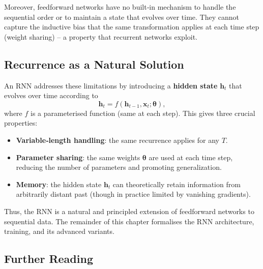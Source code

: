 \documentclass{tufte-handout}
\begin{document}
Moreover, feedforward networks have no built‑in mechanism to handle the sequential order or to maintain a state that evolves over time. They cannot capture the inductive bias that the same transformation applies at each time step (weight sharing) – a property that recurrent networks exploit.

\begin{marginfigure}
\centering
{}
\caption{Feedforward networks treat each time step independently; they cannot share weights across time or maintain a dynamic state.}
\end{marginfigure}

\subsection{Recurrence as a Natural Solution}

An RNN addresses these limitations by introducing a \textbf{hidden state} $\mathbf{h}_t$ that evolves over time according to
\[
\mathbf{h}_t = f(\mathbf{h}_{t-1}, \mathbf{x}_t; \boldsymbol{\theta}),
\]
where $f$ is a parameterised function (same at each step). This gives three crucial properties:
\begin{itemize}
    \item \textbf{Variable‑length handling}: the same recurrence applies for any $T$.
    \item \textbf{Parameter sharing}: the same weights $\boldsymbol{\theta}$ are used at each time step, reducing the number of parameters and promoting generalization.
    \item \textbf{Memory}: the hidden state $\mathbf{h}_t$ can theoretically retain information from arbitrarily distant past (though in practice limited by vanishing gradients).
\end{itemize}

Thus, the RNN is a natural and principled extension of feedforward networks to sequential data. The remainder of this chapter formalises the RNN architecture, training, and its advanced variants.

\subsection{Further Reading}
\end{document}
